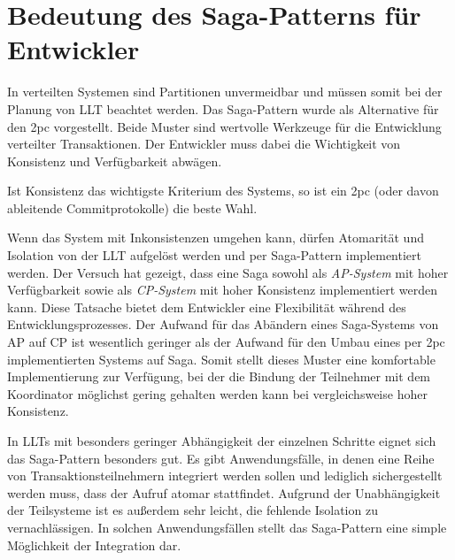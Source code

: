 \section{Bedeutung des Saga-Patterns für Entwickler}
In verteilten Systemen sind Partitionen unvermeidbar und müssen somit bei der Planung von LLT beachtet werden. Das Saga-Pattern wurde als Alternative für den \acrshort{2pc} vorgestellt. Beide Muster sind wertvolle Werkzeuge für die Entwicklung verteilter Transaktionen. Der Entwickler muss dabei die Wichtigkeit von Konsistenz und Verfügbarkeit abwägen. 

Ist Konsistenz das wichtigste Kriterium des Systems, so ist ein \acrshort{2pc} (oder davon ableitende Commitprotokolle) die beste Wahl. 

Wenn das System mit Inkonsistenzen umgehen kann, dürfen Atomarität und Isolation von der LLT aufgelöst werden und per Saga-Pattern implementiert werden. Der Versuch hat gezeigt, dass eine Saga sowohl als \textit{AP-System} mit hoher Verfügbarkeit sowie als \textit{CP-System} mit hoher Konsistenz implementiert werden kann. Diese Tatsache bietet dem Entwickler eine Flexibilität während des Entwicklungsprozesses. Der Aufwand für das Abändern eines Saga-Systems von AP auf CP ist wesentlich geringer als der Aufwand für den Umbau eines per \acrshort{2pc} implementierten Systems auf Saga. Somit stellt dieses Muster eine komfortable Implementierung zur Verfügung, bei der die Bindung der Teilnehmer mit dem Koordinator möglichst gering gehalten werden kann bei vergleichsweise hoher Konsistenz.

In LLTs mit besonders geringer Abhängigkeit der einzelnen Schritte eignet sich das Saga-Pattern besonders gut. Es gibt Anwendungsfälle, in denen eine Reihe von Transaktionsteilnehmern integriert werden sollen und lediglich sichergestellt werden muss, dass der Aufruf atomar stattfindet. Aufgrund der Unabhängigkeit der Teilsysteme ist es außerdem sehr leicht, die fehlende Isolation zu vernachlässigen. In solchen Anwendungsfällen stellt das Saga-Pattern eine simple Möglichkeit der Integration dar. 